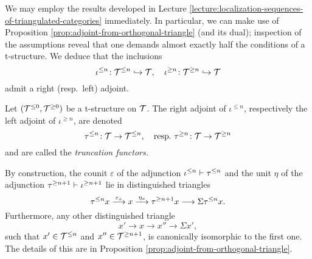 We may employ the results developed in Lecture \ref{lecture:localization-sequences-of-triangulated-categories} immediately. In particular, we can make use of
Proposition \ref{prop:adjoint-from-orthogonal-triangle} (and its dual); inspection of the assumptions reveal that one demands almost exactly half the conditions of a t-structure.
We deduce that the inclusions
\[ \iota^{\leq n}\!:\mathcal{T}^{\leq n}\hookrightarrow\mathcal{T},\quad \iota^{\geq n}\!:\mathcal{T}^{\geq n}\hookrightarrow\mathcal{T} \]
admit a right (resp.\ left) adjoint.
\begin{definition}
	Let \((\mathcal{T}^{\leq 0},\mathcal{T}^{\geq 0})\) be a t-structure on \(\mathcal{T}\). The right adjoint of \(\iota^{\leq n}\), respectively the left adjoint of \(\iota^{\geq n}\),
	are denoted
	\[ \tau^{\leq n}\!:\mathcal{T}\to\mathcal{T}^{\leq n},\quad \text{resp.\ } \tau^{\geq n}\!:\mathcal{T} \to \mathcal{T}^{\geq n} \]
	and are called the \emph{truncation functors.}
\end{definition}
By construction, the counit \(\varepsilon\) of the adjunction \(\iota^{\leq n}\vdash\tau^{\leq n}\) and the unit \(\eta\) of the adjunction \(\tau^{\geq n+1}\vdash\iota^{\geq n+1}\)
lie in distinguished triangles
\[ \tau^{\leq n}x \overset{\varepsilon_x}{\longrightarrow} x \overset{\eta_x}{\longrightarrow} \tau^{\geq n+1}x \longrightarrow \Sigma \tau^{\leq n}x. \]
Furthermore, any other distinguished triangle
\[ x' \to x \to x'' \to \Sigma x', \]
such that \(x'\in\mathcal{T}^{\leq n}\) and \(x''\in\mathcal{T}^{\geq n+1}\), is canonically isomorphic to the first one. The details of this are in Proposition \ref{prop:adjoint-from-orthogonal-triangle}.

